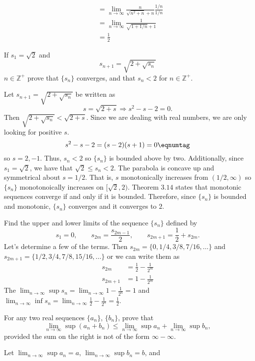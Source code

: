 \begin{exercise}
\begin{align*}
    & = \lim_{n\to\infty}\frac{n}{\sqrt{n^2 + n} + n}\frac{1/n}{1/n}\\
    & = \lim_{n\to\infty}\frac{1}{\sqrt{1 + 1/n} + 1}\\
    & = \frac{1}{2}
  \end{align*}
\item
  If \(s_1 = \sqrt{2}\) and
  \[
  s_{n + 1} = \sqrt{2 + \sqrt{s_n}}
  \]
  \(n\in\mathbb{Z}^+\) prove that \(\{s_n\}\) converges, and that \(s_n < 2\)
  for \(n\in\mathbb{Z}^+\).
  \par\smallskip
  Let \(s_{n + 1} = \sqrt{2 + \sqrt{s_n}}\) be written as
  \[
  s = \sqrt{2 + s}\Rightarrow s^2 - s - 2 = 0.
  \]
  Then \(\sqrt{2 + \sqrt{s_n}} < \sqrt{2 + s}\).
  Since we are dealing with real numbers, we are only looking for positive
  \(s\).
  \[
  s^2 - s - 2 = (s - 2)(s + 1) = 0\eqnumtag\label{3.2}
  \]
  so \(s = 2, -1\).
  Thus, \(s_n < 2\) so \(\{s_n\}\) is bounded above by two.
  Additionally, since \(s_1 = \sqrt{2}\), we have that
  \(\sqrt{2}\leq s_n < 2\).
  The parabola is concave up and symmetrical about \(s = 1/2\).
  That is, \(s\) monotonically increases from \((1/2, \infty)\) so \(\{s_n\}\)
  monotonoically increases on \(\bigl[\sqrt{2}, 2\bigr)\).
  Theorem \(3.14\) states that monotonic sequences converge if and only if it
  is bounded.
  Therefore, since \(\{s_n\}\) is bounded and monotonic, \(\{s_n\}\) converges
  and it converges to \(2\).
\item
  Find the upper and lower limits of the sequence \(\{s_n\}\) defined by
  \[
  s_1 = 0,\qquad s_{2m} = \frac{s_{2m - 1}}{2},\qquad
  s_{2m + 1} = \frac{1}{2} + s_{2m}.
  \]
  Let's determine a few of the terms.
  Then \(s_{2m} = \{0,1/4,3/8,7/16,\ldots\}\) and
  \(s_{2m + 1} = \{1/2,3/4,7/8,15/16,\ldots\}\) or we can write them as
  \begin{align*}
    s_{2m} & = \frac{1}{2} - \frac{1}{2^m}\\
    s_{2m + 1} & = 1 - \frac{1}{2^m}
  \end{align*}
  The \(\lim_{n\to\infty}\sup s_n = \lim_{n\to\infty} 1 - \frac{1}{2^n} = 1\)
  and
  \(\lim_{n\to\infty}\inf s_n = \lim_{n\to\infty} \frac{1}{2} - \frac{1}{2^n}
  = \frac{1}{2}\).
\item
  For any two real sequences \(\{a_n\}\), \(\{b_n\}\), prove that
  \[
  \lim_{n\to\infty}\sup (a_n + b_n)\leq\lim_{n\to\infty}\sup a_n +
  \lim_{n\to\infty}\sup b_n,
  \]
  provided the sum on the right is not of the form \(\infty - \infty\).
  \par\smallskip
  Let \(\lim_{n\to\infty}\sup a_n = a\), \(\lim_{n\to\infty}\sup b_n = b\), and

\end{exercise}
